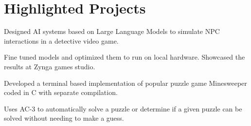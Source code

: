 \documentclass[letterpaper,10pt]{article}
\begin{document}

    \section{Highlighted Projects}

    \begin{resume_list}
        \item Designed AI systems based on Large Language Models to simulate NPC interactions in a detective video game.
        \item Fine tuned models and optimized them to run on local hardware. Showcased the results at Zynga games studio.
    \end{resume_list}

    \begin{resume_list}
        \item Developed a terminal based implementation of popular puzzle game Minesweeper coded in C with separate compilation.
        \item Uses AC-3 to automatically solve a puzzle or determine if a given puzzle can be solved without needing to make a guess.
    \end{resume_list}
\end{document}
